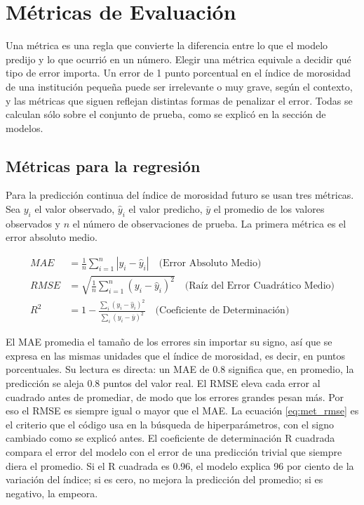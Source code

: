 \section{Métricas de Evaluación}

Una métrica es una regla que convierte la diferencia entre lo que el modelo predijo y lo que ocurrió en un número. Elegir una métrica equivale a decidir qué tipo de error importa. Un error de 1 punto porcentual en el índice de morosidad de una institución pequeña puede ser irrelevante o muy grave, según el contexto, y las métricas que siguen reflejan distintas formas de penalizar el error. Todas se calculan sólo sobre el conjunto de prueba, como se explicó en la sección de modelos.

\subsection{Métricas para la regresión}
Para la predicción continua del índice de morosidad futuro se usan tres métricas. Sea $y_i$ el valor observado, $\hat{y}_i$ el valor predicho, $\bar{y}$ el promedio de los valores observados y $n$ el número de observaciones de prueba. La primera métrica es el error absoluto medio.

\begin{align}
MAE &= \frac{1}{n}\sum_{i=1}^n |y_i-\hat{y}_i| \quad \text{(Error Absoluto Medio)} \label{eq:met_mae}\\
RMSE &= \sqrt{\frac{1}{n}\sum_{i=1}^n (y_i-\hat{y}_i)^2} \quad \text{(Raíz del Error Cuadrático Medio)} \label{eq:met_rmse}\\
R^2 &= 1-\frac{\sum_i (y_i-\hat{y}_i)^2}{\sum_i (y_i-\bar{y})^2} \quad \text{(Coeficiente de Determinación)} \label{eq:met_r2}
\end{align}

El MAE promedia el tamaño de los errores sin importar su signo, así que se expresa en las mismas unidades que el índice de morosidad, es decir, en puntos porcentuales. Su lectura es directa: un MAE de 0.8 significa que, en promedio, la predicción se aleja 0.8 puntos del valor real. El RMSE eleva cada error al cuadrado antes de promediar, de modo que los errores grandes pesan más. Por eso el RMSE es siempre igual o mayor que el MAE. La ecuación \eqref{eq:met_rmse} es el criterio que el código usa en la búsqueda de hiperparámetros, con el signo cambiado como se explicó antes. El coeficiente de determinación R cuadrada compara el error del modelo con el error de una predicción trivial que siempre diera el promedio. Si el R cuadrada es 0.96, el modelo explica 96 por ciento de la variación del índice; si es cero, no mejora la predicción del promedio; si es negativo, la empeora.

